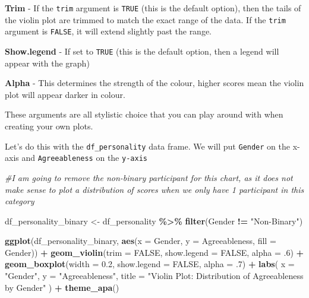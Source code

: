 \documentclass[
]{book}
\newenvironment{Shaded}{\begin{snugshade}}{\end{snugshade}}
\newcommand{\AttributeTok}[1]{\textcolor[rgb]{0.13,0.29,0.53}{#1}}
\newcommand{\CommentTok}[1]{\textcolor[rgb]{0.56,0.35,0.01}{\textit{#1}}}
\newcommand{\ConstantTok}[1]{\textcolor[rgb]{0.56,0.35,0.01}{#1}}
\newcommand{\DecValTok}[1]{\textcolor[rgb]{0.00,0.00,0.81}{#1}}
\newcommand{\FloatTok}[1]{\textcolor[rgb]{0.00,0.00,0.81}{#1}}
\newcommand{\FunctionTok}[1]{\textcolor[rgb]{0.13,0.29,0.53}{\textbf{#1}}}
\newcommand{\NormalTok}[1]{#1}
\newcommand{\OtherTok}[1]{\textcolor[rgb]{0.56,0.35,0.01}{#1}}
\newcommand{\SpecialCharTok}[1]{\textcolor[rgb]{0.81,0.36,0.00}{\textbf{#1}}}
\newcommand{\StringTok}[1]{\textcolor[rgb]{0.31,0.60,0.02}{#1}}
\begin{document}
\textbf{Trim} - If the \texttt{trim} argument is \texttt{TRUE} (this is the default option), then the tails of the violin plot are trimmed to match the exact range of the data. If the \texttt{trim} argument is \texttt{FALSE}, it will extend slightly past the range.

\textbf{Show.legend} - If set to \texttt{TRUE} (this is the default option, then a legend will appear with the graph)

\textbf{Alpha} - This determines the strength of the colour, higher scores mean the violin plot will appear darker in colour.

These arguments are all stylistic choice that you can play around with when creating your own plots.

Let's do this with the \texttt{df\_personality} data frame. We will put \texttt{Gender} on the x-axis and \texttt{Agreeableness} on the \texttt{y-axis}

\begin{Shaded}
\begin{Highlighting}[]
\CommentTok{\#I am going to remove the non{-}binary participant for this chart, as it does not make sense to plot a distribution of scores when we only have 1 participant in this category}

\NormalTok{df\_personality\_binary }\OtherTok{\textless{}{-}}\NormalTok{ df\_personality }\SpecialCharTok{\%\textgreater{}\%} 
  \FunctionTok{filter}\NormalTok{(Gender }\SpecialCharTok{!=} \StringTok{"Non{-}Binary"}\NormalTok{)}

\FunctionTok{ggplot}\NormalTok{(df\_personality\_binary, }\FunctionTok{aes}\NormalTok{(}\AttributeTok{x =}\NormalTok{ Gender, }\AttributeTok{y =}\NormalTok{ Agreeableness, }\AttributeTok{fill =}\NormalTok{ Gender)) }\SpecialCharTok{+}
  \FunctionTok{geom\_violin}\NormalTok{(}\AttributeTok{trim =} \ConstantTok{FALSE}\NormalTok{, }
              \AttributeTok{show.legend =} \ConstantTok{FALSE}\NormalTok{, }
              \AttributeTok{alpha =}\NormalTok{ .}\DecValTok{6}\NormalTok{) }\SpecialCharTok{+}
  \FunctionTok{geom\_boxplot}\NormalTok{(}\AttributeTok{width =} \FloatTok{0.2}\NormalTok{, }
               \AttributeTok{show.legend =} \ConstantTok{FALSE}\NormalTok{,}
               \AttributeTok{alpha =}\NormalTok{ .}\DecValTok{7}\NormalTok{) }\SpecialCharTok{+}
  \FunctionTok{labs}\NormalTok{(}
    \AttributeTok{x =} \StringTok{"Gender"}\NormalTok{, }
    \AttributeTok{y =} \StringTok{"Agreeableness"}\NormalTok{,}
    \AttributeTok{title =} \StringTok{"Violin Plot: Distribution of Agreeableness by Gender"} 
\NormalTok{  ) }\SpecialCharTok{+}
  \FunctionTok{theme\_apa}\NormalTok{()}
\end{Highlighting}
\end{Shaded}
\end{document}
